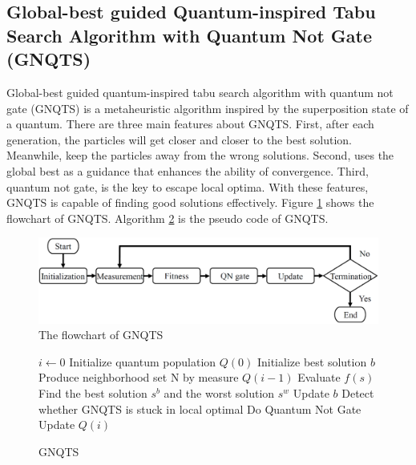 \documentclass[../main.tex]{subfiles}
\begin{document}
\subsection{Global-best guided Quantum-inspired Tabu Search Algorithm with Quantum Not Gate (GNQTS)}

Global-best guided quantum-inspired tabu search algorithm with quantum not gate (GNQTS) is a metaheuristic algorithm inspired by the superposition state of a quantum. There are three main features about GNQTS. First, after each generation, the particles will get closer and closer to the best solution. Meanwhile, keep the particles away from the wrong solutions. Second, uses the global best as a guidance that enhances the ability of convergence. Third, quantum not gate, is the key to escape local optima. With these features, GNQTS is capable of finding good solutions effectively. Figure \ref{flow} shows the flowchart of GNQTS. Algorithm \ref{GN_pseudo} is the pseudo code of GNQTS.

\bigbreak

\begin{figure}[ht]
    \centering
    \includegraphics[scale = 0.5] {figure/flowChart.png}
    \caption{The flowchart of GNQTS}
    \label{flow}
\end{figure}

\begin{figure}[ht]
    \centering
    \begin{minipage}{.6\linewidth}
        \begin{algorithm}[H]
            \caption{GNQTS}
            \label{GN_pseudo}
            \begin{algorithmic}[1]
                \State $i \leftarrow 0$
                \State Initialize quantum  population $Q(0)$
                \State Initialize best solution $b$
                \State Produce neighborhood set N by measure $Q(i-1)$
                \State Evaluate $f(s)$
                \State Find the best solution $s^b$ and the worst solution $s^w$
                \State Update $b$
                \State Detect whether GNQTS is stuck in local optimal
                \State Do Quantum Not Gate
                \EndIf
                \State Update $Q(i)$
                \EndWhile
            \end{algorithmic}
        \end{algorithm}
    \end{minipage}
\end{figure}
\end{document}
